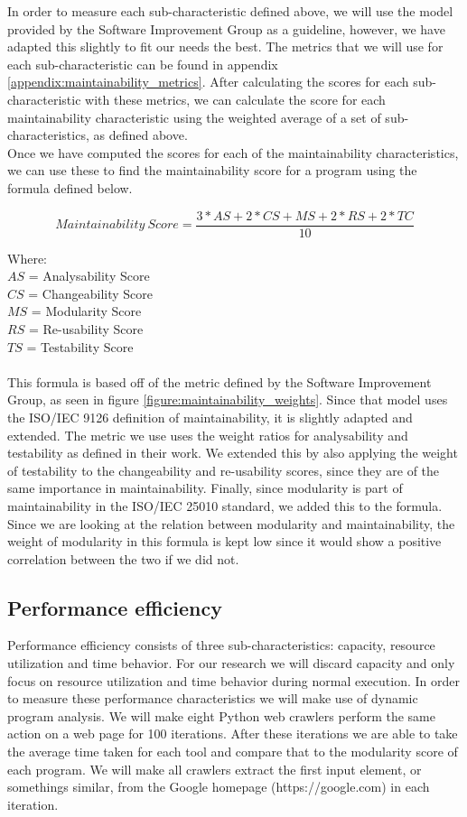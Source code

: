 \documentclass[twoside]{uva-inf-bachelor-thesis}
\begin{document}
In order to measure each sub-characteristic defined above, we will use the model provided by the Software Improvement Group\cite{heitlager2016practical} as a guideline, however, we have adapted this slightly to fit our needs the best. The metrics that we will use for each sub-characteristic can be found in appendix \ref{appendix:maintainability_metrics}. After calculating the scores for each sub-characteristic with these metrics, we can calculate the score for each maintainability characteristic using the weighted average of a set of sub-characteristics, as defined above.\\

Once we have computed the scores for each of the maintainability characteristics, we can use these to find the maintainability score for a program using the formula defined below.

\[ Maintainability\ Score = \dfrac{3 * AS + 2 * CS + MS + 2 * RS + 2 * TC}{10} \]

Where:\\
$AS$ = Analysability Score\\
$CS$ = Changeability Score\\
$MS$ = Modularity Score\\
$RS$ = Re-usability Score\\
$TS$ = Testability Score\\
\\
This formula is based off of the metric defined by the Software Improvement Group, as seen in figure \ref{figure:maintainability_weights}. Since that model uses the ISO/IEC 9126 definition of maintainability, it is slightly adapted and extended. The metric we use uses the weight ratios for analysability and testability as defined in their work. We extended this by also applying the weight of testability to the changeability and re-usability scores, since they are of the same importance in maintainability. Finally, since modularity is part of maintainability in the ISO/IEC 25010 standard, we added this to the formula. Since we are looking at the relation between modularity and maintainability, the weight of modularity in this formula is kept low since it would show a positive correlation between the two if we did not.

\subsection{Performance efficiency}
Performance efficiency consists of three sub-characteristics: capacity, resource utilization and time behavior. For our research we will discard capacity and only focus on resource utilization and time behavior during normal execution. In order to measure these performance characteristics we will make use of dynamic program analysis. We will make eight Python web crawlers perform the same action on a web page for 100 iterations. After these iterations we are able to take the average time taken for each tool and compare that to the modularity score of each program. We will make all crawlers extract the first input element, or somethings similar, from the Google homepage (https://google.com) in each iteration.\\
\end{document}
